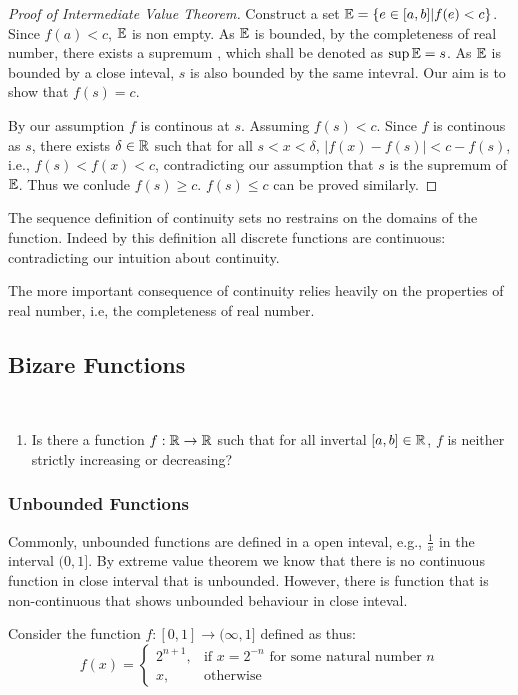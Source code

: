 \documentclass[../note.tex]{subfiles}
\begin{document}
\begin{proof}[Proof of Intermediate Value Theorem]
	Construct a set $\mathbb{E} = \{e\in [a,b]| f(e)<c\}$. Since $f(a)<c$, $\mathbb{E}$ is non empty.  
	As $\mathbb{E}$ is bounded, by the completeness of real number, there exists a supremum , which shall be denoted as $\sup{\mathbb{E}}=s$. 
	As $\mathbb{E}$ is bounded by a close inteval, $s$ is also bounded by the same intevral. Our aim is to show that $f(s)=c$.

	By our assumption $f$ is continous at $s$. Assuming $f(s) < c$. 
	Since $f$ is continous as $s$, there exists $\delta \in \mathbb{R}$ such that for all $s<x<\delta$, $|f(x)-f(s)|<c-f(s)$, i.e., $f(s)<f(x)<c$, contradicting our assumption that $s$ is the supremum of $\mathbb{E}$. 
	Thus we conlude $f(s)\geq c$. $f(s)\leq c$ can be proved similarly.
\end{proof}

\begin{remark}
	The sequence definition of continuity sets no restrains on the domains of the function. Indeed by this definition all discrete functions are continuous: contradicting our intuition about continuity.
	
	The more important consequence of continuity relies heavily on the properties of real number, i.e, the completeness of real number.
\end{remark}

\subsection{Bizare Functions}
\begin{hypothesis}
	\ 
\begin{enumerate}
	\item Is there a function $f: \mathbb{R} \rightarrow \mathbb{R}$ such that for all invertal $[a,b] \in \mathbb{R}$, $f$ is neither strictly increasing or decreasing? 

\end{enumerate}
\end{hypothesis}
\subsubsection{Unbounded Functions}
Commonly, unbounded functions are defined in a open inteval, e.g., $\frac{1}{x}$ in the interval $(0, 1]$. By extreme value theorem we know that there is no continuous function in close interval that is unbounded. However, there is function that is non-continuous that shows unbounded behaviour in close inteval.

Consider the function $f:[0,1] \rightarrow (\infty, 1]$ defined as thus:
		\[
    f(x)= 
\begin{cases}
	2^{n+1},& \text{if } x=2^{-n} \text{ for some natural number }n\\
    x,              & \text{otherwise}
\end{cases}
\]
\end{document}
